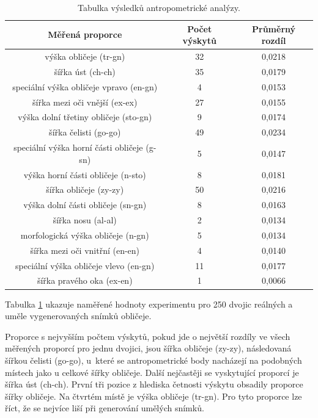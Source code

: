 \begin{table}[H]
        \centering
        \begin{tabular}{|c|c|c|}
                \hline
                Měřená proporce & Počet výskytů & Průměrný rozdíl \\
                \hline
                výška obličeje (tr-gn) & 32 & 0,0218 \\
                šířka úst (ch-ch) & 35 & 0,0179 \\
                speciální výška obličeje vpravo (en-gn) & 4 & 0,0153 \\
                šířka mezi oči vnější (ex-ex) & 27 & 0,0155 \\
                výška dolní třetiny obličeje (sto-gn) & 9 & 0,0174 \\
                šířka čelisti (go-go) & 49 & 0,0234 \\
                speciální výška horní části obličeje (g-sn) & 5 & 0,0147 \\
                výška horní části obličeje (n-sto) & 8 & 0,0181 \\
                šířka obličeje (zy-zy) & 50 & 0,0216 \\
                výška dolní části obličeje (sn-gn) & 8 & 0,0163 \\
                šířka nosu (al-al) & 2 & 0,0134 \\
                morfologická výška obličeje (n-gn) & 5 & 0,0134 \\
                šířka mezi oči vnitřní (en-en) & 4 & 0,0140 \\
                speciální výška obličeje vlevo (en-gn) & 11 & 0,0177 \\
                šířka pravého oka (ex-en) & 1 & 0,0066 \\
                \hline
        \end{tabular}
        \caption{Tabulka výsledků antropometrické analýzy.}
        \label{tab:max-differences}
\end{table}

\noindent Tabulka \ref{tab:max-differences} ukazuje naměřené hodnoty experimentu pro 250 dvojic reálných a uměle vygenerovaných snímků obličeje.

Proporce s nejvyšším počtem výskytů, pokud jde o největší rozdíly ve všech měřených proporcí pro jednu dvojici, jsou šířka obličeje (zy-zy), následovaná šířkou čelisti (go-go), u~které se antropometrické body nacházejí na podobných místech jako u celkové šířky obličeje. Další nejčastěji se vyskytující proporcí je šířka úst (ch-ch). První tři pozice z hlediska četnosti výskytu obsadily proporce šířky obličeje. Na čtvrtém místě je výška obličeje (tr-gn). Pro tyto proporce lze říct, že se nejvíce liší při generování umělých snímků.

